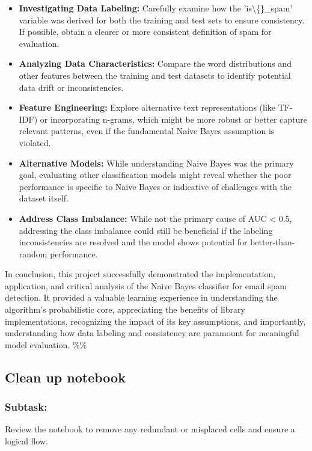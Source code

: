 \documentclass[12pt,a4paper]{article}
\begin{document}
\begin{itemize}
    \item \textbf{Investigating Data Labeling:} Carefully examine how the 'is\textbackslash\{\}\_spam' variable was derived for both the training and test sets to ensure consistency. If possible, obtain a clearer or more consistent definition of spam for evaluation.
    \item \textbf{Analyzing Data Characteristics:} Compare the word distributions and other features between the training and test datasets to identify potential data drift or inconsistencies.
    \item \textbf{Feature Engineering:} Explore alternative text representations (like TF-IDF) or incorporating n-grams, which might be more robust or better capture relevant patterns, even if the fundamental Naive Bayes assumption is violated.
    \item \textbf{Alternative Models:} While understanding Naive Bayes was the primary goal, evaluating other classification models might reveal whether the poor performance is specific to Naive Bayes or indicative of challenges with the dataset itself.
    \item \textbf{Address Class Imbalance:} While not the primary cause of AUC < 0.5, addressing the class imbalance could still be beneficial if the labeling inconsistencies are resolved and the model shows potential for better-than-random performance.
\end{itemize}

In conclusion, this project successfully demonstrated the implementation, application, and critical analysis of the Naive Bayes classifier for email spam detection. It provided a valuable learning experience in understanding the algorithm's probabilistic core, appreciating the benefits of library implementations, recognizing the impact of its key assumptions, and importantly, understanding how data labeling and consistency are paramount for meaningful model evaluation.
\%\%


\subsection{Clean up notebook}

\subsubsection{Subtask:}
Review the notebook to remove any redundant or misplaced cells and ensure a logical flow.
\end{document}
